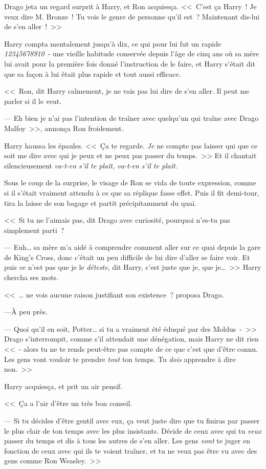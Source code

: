 Drago jeta un regard surprit à Harry, et Ron acquiesça. <<~C'est ça Harry~! Je veux dire M. Bronze~! Tu vois le genre de personne qu'il est~? Maintenant dis-lui de s'en aller~!~>>

Harry compta mentalement jusqu'à dix, ce qui pour lui fut un rapide \emph{12345678910}~- une vieille habitude conservée depuis l'âge de cinq ans où sa mère lui avait pour la première fois donné l'instruction de le faire, et Harry s'était dit que sa façon à lui était plus rapide et tout aussi efficace.

<<~Ron, dit Harry calmement, je ne vais pas lui dire de s'en aller. Il peut me parler si il le veut.

--- Eh bien je n'ai pas l'intention de traîner avec quelqu'un qui traîne avec Drago Malfoy~>>, annonça Ron froidement.

Harry haussa les épaules. <<~Ça te regarde. \emph{Je} ne compte pas laisser qui que ce soit me dire avec qui je peux et ne peux pas passer du temps.~>> Et il chantait silencieusement \emph{va-t-en s'il te plaît, va-t-en s'il te plaît}.

Sous le coup de la surprise, le visage de Ron se vida de toute expression, comme si il s'était vraiment attendu à ce que sa réplique fasse effet. Puis il fit demi-tour, tira la laisse de son bagage et partit précipitamment du quai.

<<~Si tu ne l'aimais pas, dit Drago avec curiosité, pourquoi n'es-tu pas simplement parti~?

--- Euh… sa mère m'a aidé à comprendre comment aller sur ce quai depuis la gare de King's Cross, donc c'était un peu difficile de lui dire d'aller se faire voir. Et puis ce n'est pas que je le \emph{déteste}, dit Harry, c'est juste que je, que je…~>> Harry chercha ses mots.

<<~… ne vois aucune raison justifiant son existence~? proposa Drago.

---À peu près.

--- Quoi qu'il en soit, Potter… si tu a vraiment été éduqué par des Moldus~-~>> Drago s'interrompit, comme s'il attendait une dénégation, mais Harry ne dit rien <<~- alors tu ne te rends peut-être pas compte de ce que c'est que d'être connu. Les gens vont vouloir te prendre \emph{tout} ton temps. Tu \emph{dois} apprendre à dire non.~>>

Harry acquiesça, et prit un air pensif.

<<~Ça a l'air d'être un très bon conseil.

--- Si tu décides d'être gentil avec eux, ça veut juste dire que tu finiras par passer le plus clair de ton temps avec les plus insistants. Décide de ceux avec qui tu \emph{veux} passer du temps et dis à tous les autres de s'en aller. Les gens \emph{vont} te juger en fonction de ceux avec qui ils te voient traîner, et tu ne veux pas être vu avec des gens comme Ron Weasley.~>>

